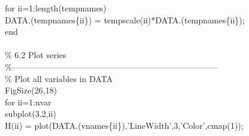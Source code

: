 \hspace{1mm}\hspace{5mm} \hspace{5mm} \textcolor{matlabblue}{for} ii=1:length(tempnames) \\ 
\hspace{1mm}\hspace{5mm} \hspace{5mm} \hspace{5mm} DATA.(tempnames\{ii\}) = tempscale(ii)*DATA.(tempnames\{ii\}); \\ 
\hspace{1mm}\hspace{5mm} \hspace{5mm} \textcolor{matlabblue}{end} \\ 
\hspace{1mm}\hspace{5mm} \hspace{5mm}  \\ 
\hspace{1mm}\hspace{5mm} \hspace{5mm} \textcolor{matlabgreen}{\% 6.2 Plot series }\\ 
\hspace{1mm}\hspace{5mm} \hspace{5mm} \textcolor{matlabgreen}{\%--------------------------------------------------------------------------  }\\ 
\hspace{1mm}\hspace{5mm} \hspace{5mm} \textcolor{matlabgreen}{\% Plot all variables in DATA }\\ 
\hspace{1mm}\hspace{5mm} \hspace{5mm} FigSize(26,18) \\ 
\hspace{1mm}\hspace{5mm} \hspace{5mm} \textcolor{matlabblue}{for} ii=1:nvar \\ 
\hspace{1mm}\hspace{5mm} \hspace{5mm} \hspace{5mm} subplot(3,2,ii) \\ 
\hspace{1mm}\hspace{5mm} \hspace{5mm} \hspace{5mm} H(ii) = plot(DATA.(vnames\{ii\}),\textcolor{matlabpurple}{'LineWidth'},3,\textcolor{matlabpurple}{'Color'},cmap(1)); \\ 
